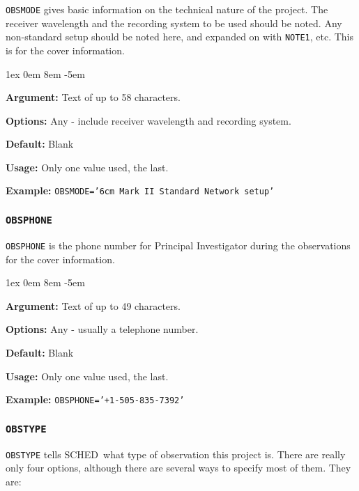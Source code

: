 \documentclass{report}
\newcommand{\schedb}{{\sc SCHED~}}
\newcommand{\rcwbox}[5]{
  \begin{list}{}{\parsep 1ex  \itemsep 0em
                 \leftmargin 8em  \itemindent -5em }
    \item {\bf Argument:} #1
    \item {\bf Options:}  #2
    \item {\bf Default:}  #3
    \item {\bf Usage:}    #4
    \item {\bf Example:}  #5
  \end{list}
}
\begin{document}
{\tt OBSMODE} gives basic information on the technical nature of
the project. The receiver wavelength and the recording system to be
used should be noted. Any non-standard setup should be noted here, and
expanded on with {\tt NOTE1}, etc.  This is for the cover information.

\rcwbox
{Text of up to 58 characters.}
{Any - include receiver wavelength and recording system.}
{Blank}
{Only one value used, the last.}
{{\tt OBSMODE='6cm  Mark II  Standard Network setup'}}


\subsubsection{\label{MP:OBSPHONE}{\tt OBSPHONE}}

{\tt OBSPHONE} is the phone number for Principal Investigator during
the observations for the cover information.

\rcwbox
{Text of up to 49 characters.}
{Any - usually a telephone number.}
{Blank}
{Only one value used, the last.}
{{\tt OBSPHONE='+1-505-835-7392'}}

\subsubsection{\label{MP:OBSTYPE}{\tt OBSTYPE}}

{\tt OBSTYPE} tells \schedb what type of observation this project is.
There are really only four options, although there are several ways
to specify most of them.  They are:
\end{document}
